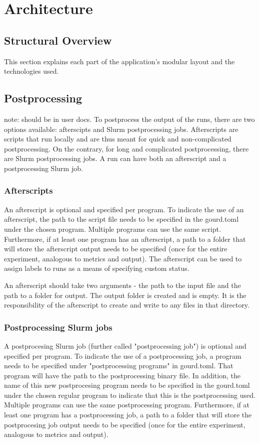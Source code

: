 \pagebreak


\section{Architecture}\label{sec:architecture}

\subsection{Structural Overview}

This section explains each part of the application's modular layout and the technologies used.


\subsection{Postprocessing}
note: should be in user docs.
To postprocess the output of the runs, there are two options available: afterscipts and Slurm postprocessing jobs. 
Afterscripts are scripts that run locally and are thus meant for quick and non-complicated 
postprocessing. On the contrary, for long and complicated postprocessing, there are Slurm postprocessing jobs.
A run can have both an afterscript and a postprocessing Slurm job.

\subsubsection{Afterscripts}
An afterscript is optional and specified per program. To indicate the use of an afterscript, the path to the script 
file needs to be specified in the gourd.toml under the chosen program. Multiple programs can use the same script.
Furthermore, if at least one program has an afterscript, a path to a folder that will store the afterscript output 
needs to be specified (once for the entire experiment, analogous to metrics and output). The afterscript can be used 
to assign labels to runs as a means of specifying custom status.

An afterscript should take two arguments - the path to the input file and the path to a folder for output. The output 
folder is created and is empty. It is the responsibility of the afterscript to create and write to any files in that 
directory.

\subsubsection{Postprocessing Slurm jobs}
A postprocesing Slurm job (further called "postprocessing job") is optional and specified per program. To indicate 
the use of a postprocessing job, a program needs to be specified under "postprocessing programs" in gourd.toml. 
That program will have the path to the postprocessing binary file. In addition, the name of this new postprocesing 
program needs to be specified in the gourd.toml under the chosen regular program to indicate that this is the 
postprocessing used. Multiple programs can use the same postprocessing program. Furthermore, if at least one program 
has a postprocessing job, a path to a folder that will store the postprocesing job output needs to be specified 
(once for the entire experiment, analogous to metrics and output). 

